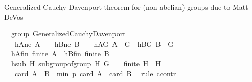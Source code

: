 \begin{isabellebody}
%
\isatagdocument
%
\isamarkuptrue%
%
\endisatagdocument
{\isafolddocument}%
%
\isadelimdocument
%
\endisadelimdocument
%
\begin{isamarkuptext}%
Generalized Cauchy-Davenport theorem for (non-abelian) groups due to Matt DeVos \cite{DeVos2016OnAG}%
\end{isamarkuptext}\isamarkuptrue%
\isamarkupfalse%
\ {\isacharparenleft}{\kern0pt}\ group{\isacharparenright}{\kern0pt}\ Generalized{\isacharunderscore}{\kern0pt}Cauchy{\isacharunderscore}{\kern0pt}Davenport{\isacharcolon}{\kern0pt}\isanewline
\ \ \ hAne{\isacharcolon}{\kern0pt}\ {\isachardoublequoteopen}A\ {\isasymnoteq}\ {\isacharbraceleft}{\kern0pt}{\isacharbraceright}{\kern0pt}{\isachardoublequoteclose}\ \ hBne{\isacharcolon}{\kern0pt}\ {\isachardoublequoteopen}B\ {\isasymnoteq}\ {\isacharbraceleft}{\kern0pt}{\isacharbraceright}{\kern0pt}{\isachardoublequoteclose}\ \ hAG{\isacharcolon}{\kern0pt}\ {\isachardoublequoteopen}A\ {\isasymsubseteq}\ G{\isachardoublequoteclose}\ \ hBG{\isacharcolon}{\kern0pt}\ {\isachardoublequoteopen}B\ {\isasymsubseteq}\ G{\isachardoublequoteclose}\ \isanewline
\ \ hAfin{\isacharcolon}{\kern0pt}\ {\isachardoublequoteopen}finite\ A{\isachardoublequoteclose}\ \ hBfin{\isacharcolon}{\kern0pt}\ {\isachardoublequoteopen}finite\ B{\isachardoublequoteclose}\ \isanewline
\ \ hsub{\isacharcolon}{\kern0pt}\ {\isachardoublequoteopen}{\isacharbraceleft}{\kern0pt}H{\isachardot}{\kern0pt}\ subgroup{\isacharunderscore}{\kern0pt}of{\isacharunderscore}{\kern0pt}group\ H\ G\ {\isacharparenleft}{\kern0pt}{\isasymcdot}{\isacharparenright}{\kern0pt}\ {\isasymone}\ {\isasymand}\ finite\ H\ {\isasymand}\ H\ {\isasymnoteq}\ {\isacharbraceleft}{\kern0pt}{\isasymone}{\isacharbraceright}{\kern0pt}{\isacharbraceright}{\kern0pt}\ {\isasymnoteq}\ {\isacharbraceleft}{\kern0pt}{\isacharbraceright}{\kern0pt}{\isachardoublequoteclose}\isanewline
\ \ \ {\isachardoublequoteopen}card\ {\isacharparenleft}{\kern0pt}A\ {\isasymcdots}\ B{\isacharparenright}{\kern0pt}\ {\isasymge}\ min\ p\ {\isacharparenleft}{\kern0pt}card\ A\ {\isacharplus}{\kern0pt}\ card\ B\ {\isacharminus}{\kern0pt}\ {}{\isacharparenright}{\kern0pt}{\isachardoublequoteclose}\isanewline
%
\isadelimproof
%
\endisadelimproof
%
\isatagproof
{}\isamarkupfalse%
{\isacharparenleft}{\kern0pt}rule\ ccontr{\isacharparenright}{\kern0pt}\isanewline

\end{isabellebody}
